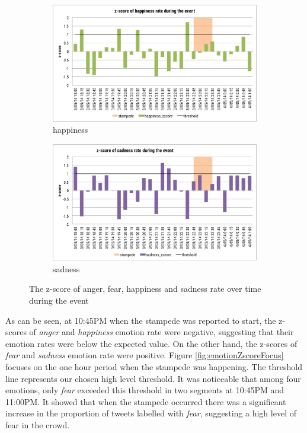 \begin{figure}[htb!]
\begin{subfigure}{0.5\textwidth}
\centering    
\includegraphics[width=0.99\linewidth]{HappinessZscoreEvent}
\caption{happiness}
\label{fig:happinessZscoreEvent}
\end{subfigure}%
\begin{subfigure}{0.5\textwidth}
\centering    
\includegraphics[width=0.99\linewidth]{SadnessZscoreEvent}
\caption{sadness}
\label{fig:sadnessZscoreEvent}
\end{subfigure}
\caption{The z-score of anger, fear, happiness and sadness rate over time during the event}
\label{fig:emotionZscoreEvent}
\end{figure}

As can be seen, at 10:45PM when the stampede was reported to start, the z-scores of \textit{anger} and \textit{happiness} emotion rate were negative, suggesting that their emotion rates were below the expected value. On the other hand, the z-scores of \textit{fear} and \textit{sadness} emotion rate were positive. Figure \ref{fig:emotionZscoreFocus} focuses on the one hour period when the stampede was happening. The threshold line represents our chosen high level threshold. It was noticeable that among four emotions, only \textit{fear} exceeded this threshold in two segments at 10:45PM and 11:00PM. It showed that when the stampede occurred there was a significant increase in the proportion of tweets labelled with \textit{fear}, suggesting a high level of fear in the crowd.

